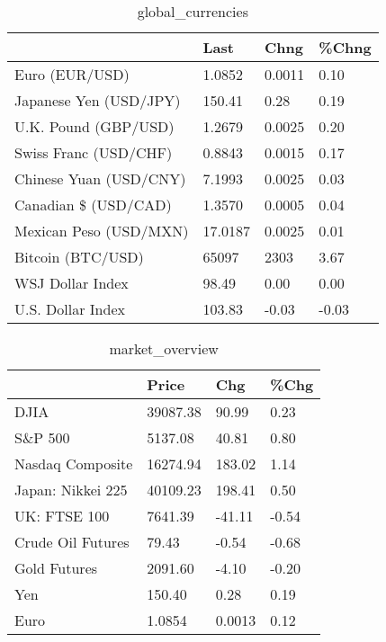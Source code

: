 \documentclass{article}%
\begin{document}
%


\begin{table}[htbp]%
\caption{global\_currencies}%
\centering%
\begin{adjustbox}{width=1\textwidth}%
\begin{tabular}{llll}
\toprule
                       &    Last &   Chng & \%Chng \\
\midrule
        Euro (EUR/USD) &  1.0852 & 0.0011 &  0.10 \\
Japanese Yen (USD/JPY) &  150.41 &   0.28 &  0.19 \\
  U.K. Pound (GBP/USD) &  1.2679 & 0.0025 &  0.20 \\
 Swiss Franc (USD/CHF) &  0.8843 & 0.0015 &  0.17 \\
Chinese Yuan (USD/CNY) &  7.1993 & 0.0025 &  0.03 \\
  Canadian \$ (USD/CAD) &  1.3570 & 0.0005 &  0.04 \\
Mexican Peso (USD/MXN) & 17.0187 & 0.0025 &  0.01 \\
     Bitcoin (BTC/USD) &   65097 &   2303 &  3.67 \\
      WSJ Dollar Index &   98.49 &   0.00 &  0.00 \\
     U.S. Dollar Index &  103.83 &  -0.03 & -0.03 \\
\bottomrule
\end{tabular}
%
\end{adjustbox}%
\end{table}

%


\begin{table}[htbp]%
\caption{market\_overview}%
\centering%
\begin{adjustbox}{width=1\textwidth}%
\begin{tabular}{llll}
\toprule
                  &    Price &    Chg &  \%Chg \\
\midrule
             DJIA & 39087.38 &  90.99 &  0.23 \\
          S\&P 500 &  5137.08 &  40.81 &  0.80 \\
 Nasdaq Composite & 16274.94 & 183.02 &  1.14 \\
Japan: Nikkei 225 & 40109.23 & 198.41 &  0.50 \\
     UK: FTSE 100 &  7641.39 & -41.11 & -0.54 \\
Crude Oil Futures &    79.43 &  -0.54 & -0.68 \\
     Gold Futures &  2091.60 &  -4.10 & -0.20 \\
              Yen &   150.40 &   0.28 &  0.19 \\
             Euro &   1.0854 & 0.0013 &  0.12 \\
\bottomrule
\end{tabular}
%
\end{adjustbox}%
\end{table}

%
\end{document}
